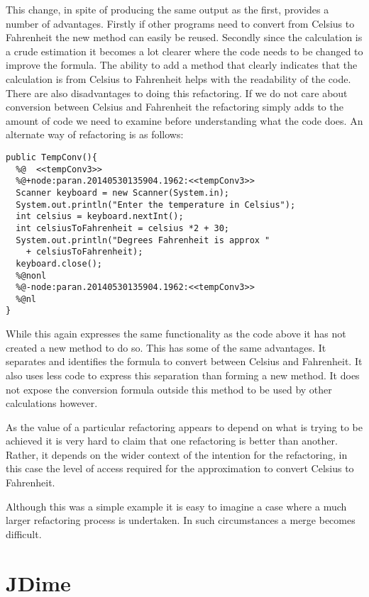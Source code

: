 This change, in spite of producing the same output as the first, provides a number of advantages. Firstly if other programs need to convert from Celsius to Fahrenheit the new method can easily be reused. Secondly since the calculation is a crude estimation it becomes a lot clearer where the code needs to be changed to improve the formula. The ability to add a method that clearly indicates that the calculation is from Celsius to Fahrenheit helps with the readability of the code. There are also disadvantages to doing this refactoring. If we do not care about conversion between Celsius and Fahrenheit the refactoring simply adds to the amount of code we need to examine before understanding what the code does. An alternate way of refactoring is as follows:

\begin{lstlisting}
public TempConv(){
  %@  <<tempConv3>>
  %@+node:paran.20140530135904.1962:<<tempConv3>>
  Scanner keyboard = new Scanner(System.in);
  System.out.println("Enter the temperature in Celsius");
  int celsius = keyboard.nextInt();
  int celsiusToFahrenheit = celsius *2 + 30;
  System.out.println("Degrees Fahrenheit is approx " 
    + celsiusToFahrenheit);
  keyboard.close();
  %@nonl
  %@-node:paran.20140530135904.1962:<<tempConv3>>
  %@nl
}
\end{lstlisting}

While this again expresses the same functionality as the code above it has not created a new method to do so. This has some of the same advantages. It separates and identifies the formula to convert between Celsius and Fahrenheit. It also uses less code to express this separation than forming a new method. It does not expose the conversion formula outside this method to be used by other calculations however.

As the value of a particular refactoring appears to depend on what is trying to be achieved it is very hard to claim that one refactoring is better than another. Rather, it depends on the wider context of the intention for the refactoring, in this case the level of access required for the approximation to convert Celsius to Fahrenheit.

Although this was a simple example it is easy to imagine a case where a much larger refactoring process is undertaken. In such circumstances a merge becomes difficult. 

\section{JDime}

